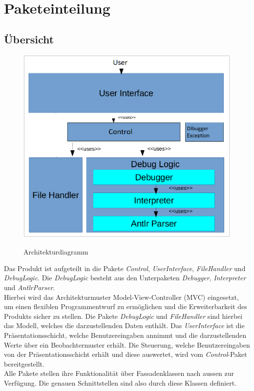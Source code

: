 \documentclass[parskip=full]{scrartcl}
\begin{document}
\newpage


\section{Paketeinteilung}\label{Packages} %

\subsection{Übersicht}

\begin{figure}[!h]
\centering
\includegraphics[scale=0.35]{../Plichtenheft/Architektur.png} \\
\caption{Architekturdiagramm}
\end{figure}
Das Produkt ist aufgeteilt in die Pakete \textit{Control}, \textit{UserInterface}, \textit{FileHandler} und \textit{DebugLogic}.
Die \textit{DebugLogic} besteht aus den Unterpaketen \textit{Debugger}, \textit{Interpreter} und
\textit{AntlrParser}.\\
Hierbei wird das Architekturmuster Model-View-Controller (MVC) eingesetzt, um einen flexiblen Programmentwurf zu ermöglichen und die Erweiterbarkeit des Produkts sicher zu stellen. Die Pakete \textit{DebugLogic} und \textit{FileHandler} sind hierbei das Modell, welches die darzustellenden Daten enthält. Das \textit{UserInterface} ist die Präsentationsschicht, welche Benutzereingaben annimmt und die darzustellenden Werte über ein Beobachtermuster erhält. Die Steuerung, welche Benutzereingaben von der Präsentationsschicht erhält und diese auswertet, wird vom \textit{Control}-Paket bereitgestellt. \\
Alle Pakete stellen ihre Funktionalität über Fassadenklassen nach aussen zur Verfügung. Die genauen Schnittstellen sind also durch diese Klassen definiert.
\end{document}
